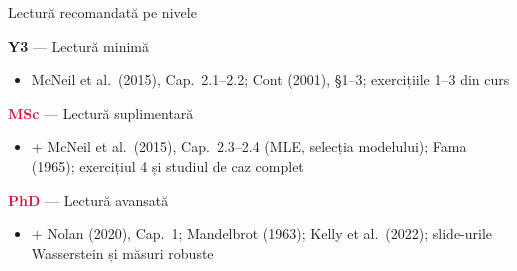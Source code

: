 \documentclass[9pt, aspectratio=169, t]{beamer}
\theoremstyle{definition}
\begin{document}
\begin{frame}{Lectură recomandată pe nivele}
\begin{block}{\textcolor{Forest}{\textbf{Y3}} --- Lectură minimă}
\begin{itemize}\setlength\itemsep{0pt}
\item McNeil et al.\ (2015), Cap.\ 2.1--2.2; Cont (2001), \S1--3; exercițiile 1--3 din curs
\end{itemize}
\end{block}
\begin{block}{\textcolor{Crimson}{\textbf{MSc}} --- Lectură suplimentară}
\begin{itemize}\setlength\itemsep{0pt}
\item + McNeil et al.\ (2015), Cap.\ 2.3--2.4 (MLE, selecția modelului); Fama (1965); exercițiul 4 și studiul de caz complet
\end{itemize}
\end{block}
\begin{block}{\textcolor{Crimson}{\textbf{PhD}} --- Lectură avansată}
\begin{itemize}\setlength\itemsep{0pt}
\item + Nolan (2020), Cap.\ 1; Mandelbrot (1963); Kelly et al.\ (2022); slide-urile Wasserstein și măsuri robuste
\end{itemize}
\end{block}
\end{frame}
\end{document}
